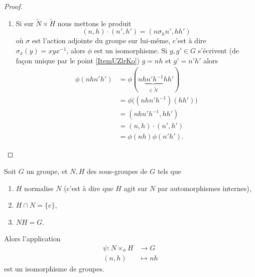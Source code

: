 \begin{proof}
\begin{enumerate}
        \item
            Si sur \( \tilde N\times \tilde H\) nous mettons le produit
            \begin{equation}
                (n,h)\cdot(n',h')=(n\sigma_hn',hh')
            \end{equation}
            où \( \sigma\) est l'action adjointe du groupe sur lui-même, c'est à dire \( \sigma_x(y)=xyx^{-1}\), alors \( \phi\) est un isomorphisme. Si \( g,g'\in G\) s'écrivent (de façon unique par le point \ref{ItemUZlrKo}) \( g=nh\) et \( g'=n'h'\) alors
            \begin{subequations}
                \begin{align}
                    \phi(nhn'h')&=\phi(n\underbrace{hn'h^{-1}}_{\in \tilde N}hh')\\
                    &=\phi\big( (nhn'h^{-1})(hh') \big)\\
                    &=(nhn'h^{-1},hh')\\
                    &=(n,h)\cdot(n',h')\\
                    &=\phi(nh)\phi(n'h').
                \end{align}
            \end{subequations}
    \end{enumerate}
\end{proof}

\begin{corollary}\label{CoroGohOZ}
    Soit \( G\) un groupe, et \( N,H\) des sous-groupes de \( G\) tels que
    \begin{enumerate}
        \item
            \( H\) normalise \( N\) (c'est à dire que \( H\) agit sur \( N\) par automorphismes internes),
        \item
            \( H\cap N=\{ e \}\),

        \item
            \( NH=G\).
    \end{enumerate}
    Alors l'application
    \begin{equation}
        \begin{aligned}
            \psi\colon N\times_{\sigma}H&\to G \\
            (n,h)&\mapsto nh 
        \end{aligned}
    \end{equation}
    est un isomorphisme de groupes.
\end{corollary}


